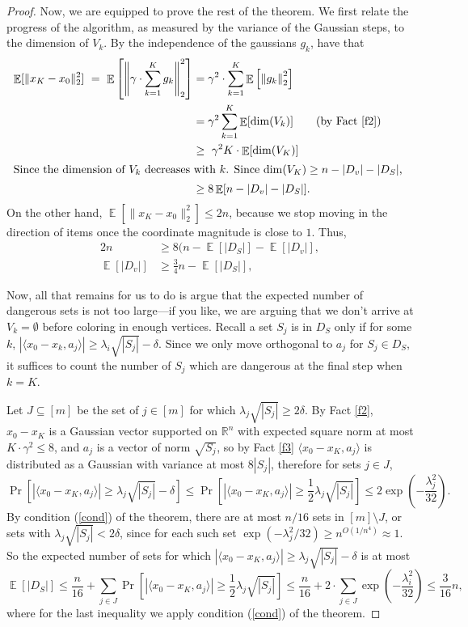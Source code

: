 \documentclass{article}
\theoremstyle{theorem}
\theoremstyle{definition}
\newcommand{\R}{\mathbb{R}}
\newcommand{\E}{\mathop{\mathbb{E}}}
\begin{document}
\begin{proof}
Now, we are equipped to prove the rest of the theorem.
We first relate the progress of the algorithm, as measured by the variance of the Gaussian steps, to the dimension of $V_k$.
By the independence of the gaussians $g_k$, have that
\begin{align*}
\E[\|x_{K} - x_0\|_2^2]
~=~ \E\left[\left\|\gamma \cdot \sum_{k=1}^K g_k\right\|_2^2\right]
&= \gamma^2 \cdot \sum_{k=1}^K \E\left[\left\|g_k\right\|_2^2\right]\\
    &= \gamma^2 \sum_{k=1}^K \E[\dim(V_k)] \qquad (\text{by Fact \ref{f2}})\\
&\ge~ \gamma^2 K \cdot \E[\dim(V_K)]\\
\intertext{Since the dimension of $V_k$ decreases with $k$. Since $\dim(V_K) \ge n - |D_v| - |D_S|$, }
&\ge 8 \E[n - |D_v| - |D_S|].
\end{align*}
On the other hand, $\E[\|x_{K} - x_0\|_2^2] \le 2n$, because we stop moving in the direction of items once the coordinate magnitude is close to $1$.
Thus,
\begin{align}
2n &\ge 8 (n - \E[|D_S|] - \E[|D_v|],\nonumber\\
    \E[|D_v|] &\ge \frac{3}{4}n - \E[|D_S|],\label{dsbd}
\end{align}

Now, all that remains for us to do is argue that the expected number of dangerous sets is not too large---if you like, we are arguing that we don't arrive at $V_k = \emptyset$ before coloring in enough vertices.
    Recall a set $S_j$ is in $D_S$ only if for some $k$, $|\langle x_0 - x_k, a_j\rangle| \ge \lambda_i\sqrt{|S_j|} - \delta$.
Since we only move orthogonal to $a_j$ for $S_j \in D_S$, it suffices to count the number of $S_j$ which are dangerous at the final step when $k = K$.

    Let $J \subseteq [m]$ be the set of $j \in [m]$ for which $\lambda_j\sqrt{|S_j|} \ge 2\delta$.
   By Fact \ref{f2}, $x_0 - x_K$ is a Gaussian vector supported on $\R^n$ with expected square norm at most $K \cdot \gamma^2 \le 8$, and $a_j$ is a vector of norm $\sqrt{S_j}$, so by Fact \ref{f3} $\langle x_0-x_K, a_j\rangle$ is distributed as a Gaussian with variance at most $8|S_j|$, therefore for sets $j \in J$,
\[
\Pr\left[|\langle x_0 - x_K, a_j\rangle| \ge \lambda_j\sqrt{|S_j|} - \delta\right]
\le
\Pr\left[|\langle x_0 - x_K, a_j\rangle| \ge \frac{1}{2}\lambda_j\sqrt{|S_j|}\right]
    \le 2\exp\left(-\frac{\lambda_j^2}{32}\right).
\]
    By condition (\ref{cond}) of the theorem, there are at most $n/16$ sets in $[m]\setminus J$, or sets with $\lambda_j\sqrt{|S_j|} < 2\delta$, since for each such set $\exp(-\lambda_j^2/32) \ge n^{O(1/n^4)} \approx 1$.
    So the expected number of sets for which $|\langle x_0 - x_K, a_j\rangle| \ge \lambda_j\sqrt{|S_j|} -\delta $ is at most
\begin{equation}
\E[|D_S|]
    \le \frac{n}{16} + \sum_{j\in J} \Pr\left[|\langle x_0 - x_K, a_j\rangle| \ge \frac{1}{2}\lambda_j\sqrt{|S_j|} \right]
    \le \frac{n}{16} + 2\cdot \sum_{j \in J} \exp\left(-\frac{\lambda_i^2}{32}\right) \le \frac{3}{16}n, \label{dsbd}
\end{equation}
where for the last inequality we apply condition (\ref{cond}) of the theorem.


\end{proof}
\end{document}
